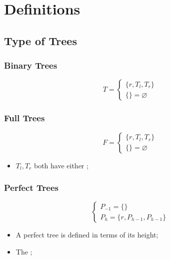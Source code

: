 \section{Definitions}

\subsection{Type of Trees}

  \subsubsection{Binary Trees}

    \begin{equation}
      T =
      \begin{cases}
        \{ r, T_{l}, T_{r} \} \\
        \{ \} = \varnothing
      \end{cases}
    \end{equation}

  \subsubsection{Full Trees}

    \begin{equation}
      F =
      \begin{cases}
        \{ r, T_{l}, T_{r} \} \\
        \{ \} = \varnothing
      \end{cases}
    \end{equation}

    \begin{itemize}
      \item $ T_{l}, T_{r} $ both have either ;
    \end{itemize}

  \subsubsection{Perfect Trees}

    \begin{equation}
      \begin{cases}
        P_{-1} = \{ \} \\
        P_{h} = \{ r, P_{h - 1}, P_{h - 1} \}
      \end{cases}
    \end{equation}

    \begin{itemize}
      \item A perfect tree is defined in terms of its height;
      \item The ;
    \end{itemize}

